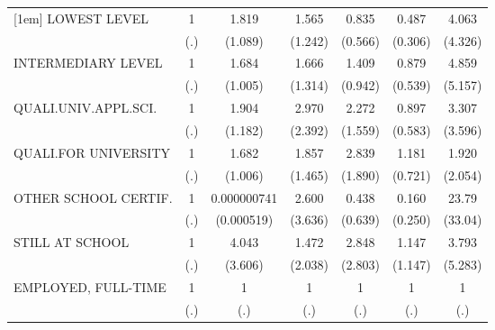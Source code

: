 {\begin{tabular}{l*{6}{c}}
[1em]
LOWEST LEVEL                  &         1         &     1.819         &     1.565         &     0.835         &     0.487         &     4.063         \\
                              &       (.)         &   (1.089)         &   (1.242)         &   (0.566)         &   (0.306)         &   (4.326)         \\
[1em]
INTERMEDIARY LEVEL            &         1         &     1.684         &     1.666         &     1.409         &     0.879         &     4.859         \\
                              &       (.)         &   (1.005)         &   (1.314)         &   (0.942)         &   (0.539)         &   (5.157)         \\
[1em]
QUALI.UNIV.APPL.SCI.          &         1         &     1.904         &     2.970         &     2.272         &     0.897         &     3.307         \\
                              &       (.)         &   (1.182)         &   (2.392)         &   (1.559)         &   (0.583)         &   (3.596)         \\
[1em]
QUALI.FOR UNIVERSITY          &         1         &     1.682         &     1.857         &     2.839         &     1.181         &     1.920         \\
                              &       (.)         &   (1.006)         &   (1.465)         &   (1.890)         &   (0.721)         &   (2.054)         \\
[1em]
OTHER SCHOOL CERTIF.          &         1         &0.000000741         &     2.600         &     0.438         &     0.160         &     23.79\sym{*}  \\
                              &       (.)         &(0.000519)         &   (3.636)         &   (0.639)         &   (0.250)         &   (33.04)         \\
[1em]
STILL AT SCHOOL               &         1         &     4.043         &     1.472         &     2.848         &     1.147         &     3.793         \\
                              &       (.)         &   (3.606)         &   (2.038)         &   (2.803)         &   (1.147)         &   (5.283)         \\
[1em]
EMPLOYED, FULL-TIME           &         1         &         1         &         1         &         1         &         1         &         1         \\
                              &       (.)         &       (.)         &       (.)         &       (.)         &       (.)         &       (.)         \\

\end{tabular}}
